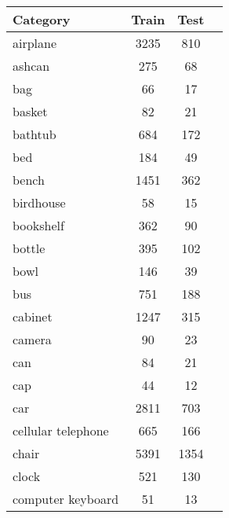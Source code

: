 \begin{table}[]
	\centering
	\begin{tabular}[t]{lccl}
		\hline
		\textbf{Category}  & \textbf{Train} & \textbf{Test} & \hspace{4pt} \\ \hline
		airplane           & 3235           & 810           &              \\
		ashcan             & 275            & 68            &              \\
		bag                & 66             & 17            &              \\
		basket             & 82             & 21            &              \\
		bathtub            & 684            & 172           &              \\
		bed                & 184            & 49            &              \\
		bench              & 1451           & 362           &              \\
		birdhouse          & 58             & 15            &              \\
		bookshelf          & 362            & 90            &              \\
		bottle             & 395            & 102           &              \\
		bowl               & 146            & 39            &              \\
		bus                & 751            & 188           &              \\
		cabinet            & 1247           & 315           &              \\
		camera             & 90             & 23            &              \\
		can                & 84             & 21            &              \\
		cap                & 44             & 12            &              \\
		car                & 2811           & 703           &              \\
		cellular telephone & 665            & 166           &              \\
		chair              & 5391           & 1354          &              \\
		clock              & 521            & 130           &              \\
		computer keyboard  & 51             & 13            &              \\

\end{tabular}
\end{table}
